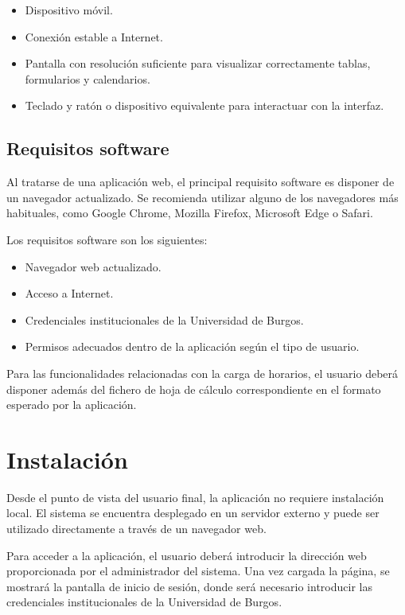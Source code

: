 \begin{itemize}
	\item Dispositivo móvil.
	\item Conexión estable a Internet.
	\item Pantalla con resolución suficiente para visualizar correctamente tablas, formularios y calendarios.
	\item Teclado y ratón o dispositivo equivalente para interactuar con la interfaz.
\end{itemize}

\subsection{Requisitos software}

Al tratarse de una aplicación web, el principal requisito software es disponer de un navegador actualizado. Se recomienda utilizar alguno de los navegadores más habituales, como Google Chrome, Mozilla Firefox, Microsoft Edge o Safari.

Los requisitos software son los siguientes:

\begin{itemize}
	\item Navegador web actualizado.
	\item Acceso a Internet.
	\item Credenciales institucionales de la Universidad de Burgos.
	\item Permisos adecuados dentro de la aplicación según el tipo de usuario.
\end{itemize}

Para las funcionalidades relacionadas con la carga de horarios, el usuario deberá disponer además del fichero de hoja de cálculo correspondiente en el formato esperado por la aplicación.

\section{Instalación}

Desde el punto de vista del usuario final, la aplicación no requiere instalación local. El sistema se encuentra desplegado en un servidor externo y puede ser utilizado directamente a través de un navegador web.

Para acceder a la aplicación, el usuario deberá introducir la dirección web proporcionada por el administrador del sistema. Una vez cargada la página, se mostrará la pantalla de inicio de sesión, donde será necesario introducir las credenciales institucionales de la Universidad de Burgos.

